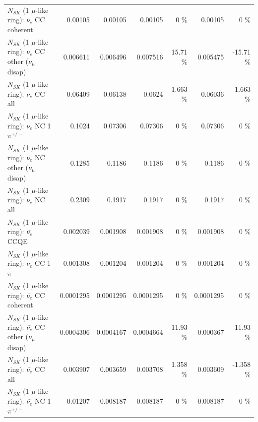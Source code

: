 \begin{table}
\begin{tabular}{| l | r | r | r  r | r  r |}
                               $N_{SK}$ (1 $\mu$-like ring): $\nu_e$ CC coherent &         0.00105 &         0.00105 &         0.00105 &        0 \%  &         0.00105 &        0 \%  \\ 
                $N_{SK}$ (1 $\mu$-like ring): $\nu_e$ CC other ($\nu_\mu$ disap) &        0.006611 &        0.006496 &        0.007516 &    15.71 \%  &        0.005475 &   -15.71 \%  \\ 
                                  $N_{SK}$ (1 $\mu$-like ring): $\nu_{e}$ CC all &         0.06409 &         0.06138 &          0.0624 &    1.663 \%  &         0.06036 &   -1.663 \%  \\ 
\hline
                           $N_{SK}$ (1 $\mu$-like ring): $\nu_e$ NC 1$\pi^{+/-}$ &          0.1024 &         0.07306 &         0.07306 &        0 \%  &         0.07306 &        0 \%  \\ 
                $N_{SK}$ (1 $\mu$-like ring): $\nu_e$ NC other ($\nu_\mu$ disap) &          0.1285 &          0.1186 &          0.1186 &        0 \%  &          0.1186 &        0 \%  \\ 
                                  $N_{SK}$ (1 $\mu$-like ring): $\nu_{e}$ NC all &          0.2309 &          0.1917 &          0.1917 &        0 \%  &          0.1917 &        0 \%  \\ 
\hline
\hline
\hline
                                $N_{SK}$ (1 $\mu$-like ring): $\bar{\nu_e}$ CCQE &        0.002039 &        0.001908 &        0.001908 &        0 \%  &        0.001908 &        0 \%  \\ 
                           $N_{SK}$ (1 $\mu$-like ring): $\bar{\nu_e}$ CC 1$\pi$ &        0.001308 &        0.001204 &        0.001204 &        0 \%  &        0.001204 &        0 \%  \\ 
                         $N_{SK}$ (1 $\mu$-like ring): $\bar{\nu_e}$ CC coherent &       0.0001295 &       0.0001295 &       0.0001295 &        0 \%  &       0.0001295 &        0 \%  \\ 
          $N_{SK}$ (1 $\mu$-like ring): $\bar{\nu_e}$ CC other ($\nu_\mu$ disap) &       0.0004306 &       0.0004167 &       0.0004664 &    11.93 \%  &        0.000367 &   -11.93 \%  \\ 
                            $N_{SK}$ (1 $\mu$-like ring): $\bar{\nu_{e}}$ CC all &        0.003907 &        0.003659 &        0.003708 &    1.358 \%  &        0.003609 &   -1.358 \%  \\ 
\hline
                     $N_{SK}$ (1 $\mu$-like ring): $\bar{\nu_e}$ NC 1$\pi^{+/-}$ &         0.01207 &        0.008187 &        0.008187 &        0 \%  &        0.008187 &        0 \%  \\ 

\end{tabular}
\end{table}
